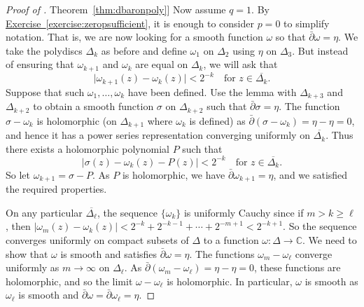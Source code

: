 \documentclass[12pt,openany]{book}
\newcommand{\sabs}[1]{\lvert {#1} \rvert}
\newcommand{\C}{{\mathbb{C}}}
\theoremstyle{plain}
\theoremstyle{remark}
\theoremstyle{definition}
\theoremstyle{exercise}
\theoremstyle{example}
\newcommand{\exerciseref}[1]{\hyperref[#1]{Exercise~\ref*{#1}}}
\newcommand{\thmref}[1]{\hyperref[#1]{Theorem~\ref*{#1}}}
\begin{document}
\begin{proof}[Proof of \thmref{thm:dbaronpoly}]
Now assume $q=1$.  By \exerciseref{exercise:zeropsufficient}, it is enough
to consider $p=0$ to simplify notation.  That is, we are now looking for
a smooth function $\omega$ so that $\bar{\partial}\omega = \eta$.
We take the polydiscs $\Delta_k$ as before and define $\omega_1$
on $\Delta_2$ using $\eta$ on $\Delta_3$.
But instead of ensuring that $\omega_{k+1}$ and $\omega_k$
are equal on $\Delta_k$, we will ask that
\begin{equation*}
\sabs{\omega_{k+1}(z)-\omega_{k}(z)} < 2^{-k}
\quad
\text{for } z \in \overline{\Delta_k} .
\end{equation*}
Suppose that such $\omega_1,\ldots,\omega_k$ have been defined.
Use the lemma with $\Delta_{k+3}$ and $\Delta_{k+2}$ to obtain a smooth function
$\sigma$ on $\Delta_{k+2}$ such that
$\bar{\partial} \sigma = \eta$.
The function $\sigma-\omega_k$ is holomorphic (on $\Delta_{k+1}$ where
$\omega_k$ is defined) as
$\bar{\partial}(\sigma-\omega_k) = \eta-\eta = 0$, and hence it has a power
series representation converging uniformly on $\overline{\Delta_k}$.  Thus there exists a
holomorphic polynomial $P$ such that
\begin{equation*}
\sabs{\sigma(z)-\omega_{k}(z) - P(z)} < 2^{-k}
\quad
\text{for } z \in \overline{\Delta_k} .
\end{equation*}
So let $\omega_{k+1} = \sigma-P$.  As $P$ is holomorphic,
we have $\bar{\partial}\omega_{k+1} = \eta$, and we satisfied the
required properties.

On any particular $\overline{\Delta_\ell}$, the sequence $\{ \omega_k \}$ is
uniformly Cauchy since if $m > k \geq \ell$, then
$\sabs{\omega_{m}(z)-\omega_k(z)} <
2^{-k}+2^{-k-1} +\cdots+2^{-m+1} < 2^{-k+1}$.  So the sequence converges
uniformly on compact subsets of $\Delta$ to a function $\omega \colon \Delta
\to \C$.  We need to show that
$\omega$ is smooth and satisfies $\bar{\partial} \omega = \eta$.
The functions
$\omega_{m}-\omega_\ell$
converge uniformly as $m \to \infty$ on $\Delta_{\ell}$.
As
$\bar{\partial}(\omega_m-\omega_\ell) = \eta-\eta = 0$, these functions
are holomorphic, and so the limit $\omega -\omega_\ell$ is holomorphic.
In particular, $\omega$ is smooth as $\omega_\ell$ is smooth and
$\bar{\partial}\omega = \bar{\partial}\omega_\ell = \eta$.
\end{proof}
\end{document}
